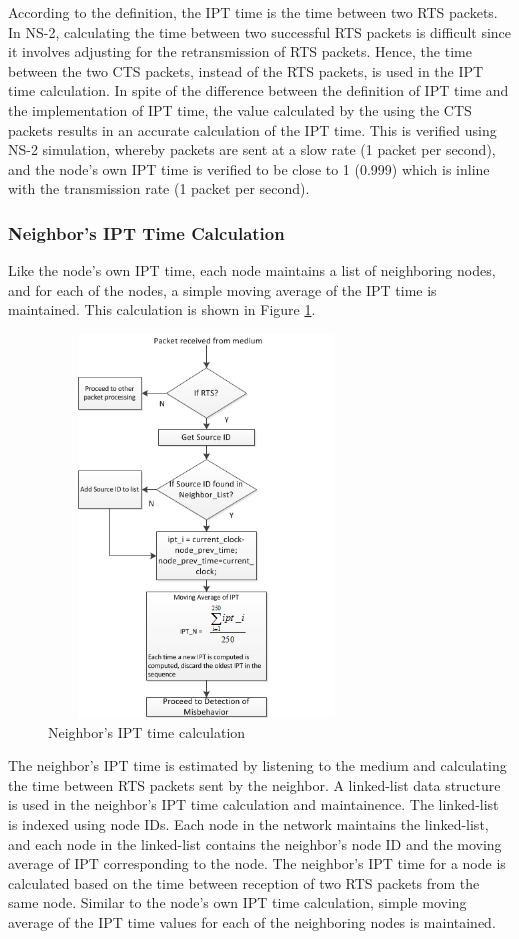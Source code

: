 \documentclass[12pt,letterpaper,english]{article}
\begin{document}
\indent According to the definition, the IPT time is the time between two RTS packets. 
In NS-2, calculating the time between two successful RTS packets is difficult since it involves adjusting for the retransmission of RTS packets. Hence, the time between the two CTS packets, instead of the RTS packets, is used in the IPT time calculation. In spite of the difference between the definition of IPT time and the implementation of IPT time, the value calculated by the using the CTS packets results in an accurate calculation of the IPT time. This is verified using NS-2 simulation, whereby packets are sent at a slow rate (1 packet per second), and the node's own IPT time is verified to be close to 1 (0.999) which is inline with the transmission rate (1 packet per second). 
\subsubsection{Neighbor's IPT Time Calculation}
\indent Like the node's own IPT time, each node maintains a list of neighboring nodes, and for each of the nodes, a simple moving average of the IPT time is maintained. This calculation is shown in Figure \ref{figure:neighboript}.
\begin{figure}[H]
\centering
\includegraphics[width=3.3in,height=4in]{figures/neighboript.png}
\caption{Neighbor's IPT time calculation}
\label{figure:neighboript}
\end{figure}
The neighbor's IPT time is estimated by listening to the medium and calculating the time between RTS packets sent by the neighbor. A linked-list data structure is used in the neighbor's IPT time calculation and maintainence. The linked-list is indexed using node IDs. Each node in the network maintains the linked-list, and each node in the linked-list contains the neighbor's node ID and the moving average of IPT corresponding to the node. The neighbor's IPT time for a node is calculated based on the time between reception of two RTS packets from the same node. Similar to the node's own IPT time calculation, simple moving average of the IPT time values for each of the neighboring nodes is maintained. 
\end{document}

